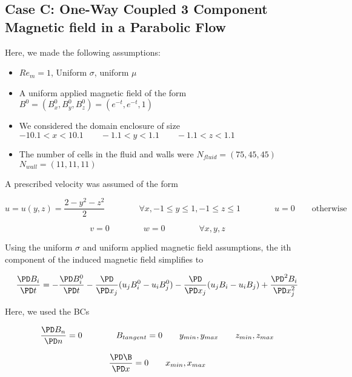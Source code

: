 \documentclass[11pt]{article}
\begin{document}
\subsection{Case C: One-Way Coupled 3 Component Magnetic field in a Parabolic Flow}

Here, we made the following assumptions:

\begin{itemize}
\item $Re_m = 1$, Uniform $\sigma$, uniform $\mu$
\item A uniform applied magnetic field of the form $B^0 = (B_x^0,B_y^0,B_z^0) = (e^{-t},e^{-t},1)$
\item We considered the domain enclosure of size $-10.1 < x < 10.1 \qquad -1.1 < y < 1.1 \qquad -1.1 < z < 1.1$
\item The number of cells in the fluid and walls were $N_{fluid} = (75,45,45)$ \qquad $N_{wall} = (11,11,11)$
\end{itemize}

A prescribed velocity was assumed of the form

\begin{equation}
	u
	=
	u(y,z)
	= \frac{2 - y^2 - z^2}{2}
	\qquad \qquad
	\forall x
	,
	-1 \le y \le 1
	,
	-1 \le z \le 1
	\qquad \qquad
	u = 0
	\qquad
	\text{otherwise}
\end{equation}

\begin{equation}
	v = 0
	\qquad \qquad
	w = 0
	\qquad \qquad
	\forall x,y,z
\end{equation}


Using the uniform $\sigma$ and uniform applied magnetic field assumptions, the ith component of the induced magnetic field simplifies to

\begin{equation}
	\frac{\PD B_i}{\PD t}
	=
	-
	\frac{\PD B_i^0}{\PD t}
	-
	\frac{\PD}{\PD x_j} (u_j B_i^0 - u_i B_j^0)
	-
	\frac{\PD}{\PD x_j} (u_j B_i - u_i B_j)
	+
	\frac{\PD^2 B_i}{\PD x_j^2}
\end{equation}

Here, we used the BCs

\begin{equation}
	\frac{\PD B_{n}}{\PD n} = 0
	\qquad \qquad
	B_{tangent} = 0
	\qquad
	y_{min}, y_{max}
	\qquad
	z_{min}, z_{max}
\end{equation}

\begin{equation}
	\frac{\PD \B}{\PD x} = 0
	\qquad
	x_{min}, x_{max}
\end{equation}
\end{document}
